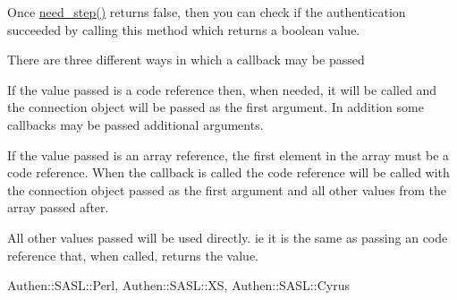 \documentclass[]{article}
\renewcommand{\emph}[1]{\underline{#1}}
\begin{document}
\begin{description}
\itemsep1pt\parskip0pt
\item[is\_success ( )]
Once \emph{need\_step()} returns false, then you can check if the
authentication succeeded by calling this method which returns a boolean
value.
\end{description}


There are three different ways in which a callback may be passed

\begin{description}
\itemsep1pt\parskip0pt
\item[CODEREF]
If the value passed is a code reference then, when needed, it will be
called and the connection object will be passed as the first argument.
In addition some callbacks may be passed additional arguments.
\end{description}

\begin{description}
\itemsep1pt\parskip0pt
\item[ARRAYREF]
If the value passed is an array reference, the first element in the
array must be a code reference. When the callback is called the code
reference will be called with the connection object passed as the first
argument and all other values from the array passed after.
\end{description}

\begin{description}
\itemsep1pt\parskip0pt
\item[SCALAR]
All other values passed will be used directly. ie it is the same as
passing an code reference that, when called, returns the value.
\end{description}


Authen::SASL::Perl, Authen::SASL::XS, Authen::SASL::Cyrus

\end{document}
